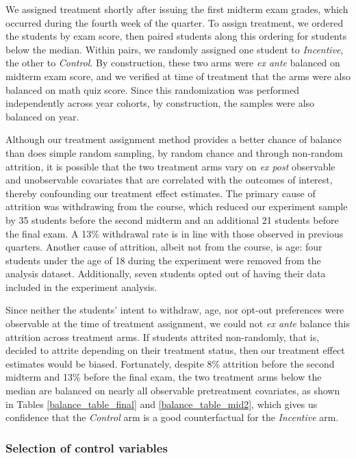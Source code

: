\documentclass[12pt]{article}
\begin{document}
We assigned treatment shortly after issuing the first midterm exam grades, which occurred during the fourth week of the quarter. To assign treatment, we ordered the students by exam score, then paired students along this ordering for students below the median. Within pairs, we randomly assigned one student to \textit{Incentive}, the other to \textit{Control}. By construction, these two arms were \textit{ex ante} balanced on midterm exam score, and we verified at time of treatment that the arms were also balanced on math quiz score. Since this randomization was performed independently across year cohorts, by construction, the samples were also balanced on year.

Although our treatment assignment method provides a better chance of balance than does simple random sampling, by random chance and through non-random attrition, it is possible that the two treatment arms vary on \textit{ex post} observable and unobservable covariates that are correlated with the outcomes of interest, thereby confounding our treatment effect estimates. The primary cause of attrition was withdrawing from the course, which reduced our experiment sample by 35 students before the second midterm and an additional 21 students before the final exam. A 13\% withdrawal rate is in line with those observed in previous quarters. Another cause of attrition, albeit not from the course, is age: four students under the age of 18 during the experiment were removed from the analysis dataset. Additionally, seven students opted out of having their data included in the experiment analysis.

Since neither the students' intent to withdraw, age, nor opt-out preferences were observable at the time of treatment assignment, we could not \textit{ex ante} balance this attrition across treatment arms. If students attrited non-randomly, that is, decided to attrite depending on their treatment status, then our treatment effect estimates would be biased. Fortunately, despite 8\% attrition before the second midterm and 13\% before the final exam, the two treatment arms below the median are balanced on nearly all observable pretreatment covariates, as shown in Tables \ref{balance_table_final} and \ref{balance_table_mid2}, which gives us confidence that the \textit{Control} arm is a good counterfactual for the \textit{Incentive} arm.

\subsubsection{Selection of control variables} \label{a_selection}
\end{document}
